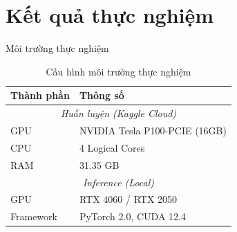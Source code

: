 \section{Kết quả thực nghiệm}

\begin{frame}{Môi trường thực nghiệm}
    \begin{table}
        \centering
        \begin{tabular}{|l|l|}
            \hline
            \textbf{Thành phần} & \textbf{Thông số} \\
            \hline
            \multicolumn{2}{|c|}{\textit{Huấn luyện (Kaggle Cloud)}} \\
            \hline
            GPU & NVIDIA Tesla P100-PCIE (16GB) \\
            \hline
            CPU & 4 Logical Cores \\
            \hline
            RAM & 31.35 GB \\
            \hline
            \multicolumn{2}{|c|}{\textit{Inference (Local)}} \\
            \hline
            GPU & RTX 4060 / RTX 2050 \\
            \hline
            Framework & PyTorch 2.0, CUDA 12.4 \\
            \hline
        \end{tabular}
        \caption{Cấu hình môi trường thực nghiệm}
    \end{table}
\end{frame}

